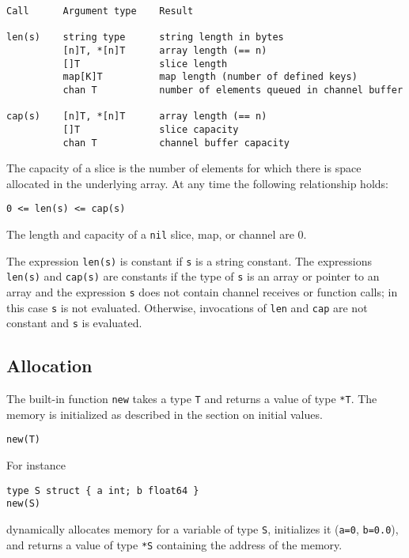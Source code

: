 \begin{Verbatim}[frame=single]
Call      Argument type    Result

len(s)    string type      string length in bytes
          [n]T, *[n]T      array length (== n)
          []T              slice length
          map[K]T          map length (number of defined keys)
          chan T           number of elements queued in channel buffer

cap(s)    [n]T, *[n]T      array length (== n)
          []T              slice capacity
          chan T           channel buffer capacity
\end{Verbatim}

The capacity of a slice is the number of elements for which there is
space allocated in the underlying array. At any time the following
relationship holds:

\begin{Verbatim}[frame=single]
0 <= len(s) <= cap(s)
\end{Verbatim}

The length and capacity of a \texttt{nil} slice, map, or channel are 0.

The expression \texttt{len(s)} is constant if \texttt{s} is a string
constant. The expressions \texttt{len(s)} and \texttt{cap(s)} are
constants if the type of \texttt{s} is an array or pointer to an
array and the expression \texttt{s} does not contain channel receives
or function calls; in this case \texttt{s} is not evaluated.
Otherwise, invocations of \texttt{len} and \texttt{cap} are not
constant and \texttt{s} is evaluated.

\subsection*{Allocation}

The built-in function \texttt{new} takes a type \texttt{T} and returns a
value of type \texttt{*T}. The memory is initialized as described in the
section on initial values.

\begin{Verbatim}[frame=single]
new(T)
\end{Verbatim}

For instance

\begin{Verbatim}[frame=single]
type S struct { a int; b float64 }
new(S)
\end{Verbatim}

dynamically allocates memory for a variable of type \texttt{S},
initializes it (\texttt{a=0}, \texttt{b=0.0}), and returns a value of
type \texttt{*S} containing the address of the memory.

